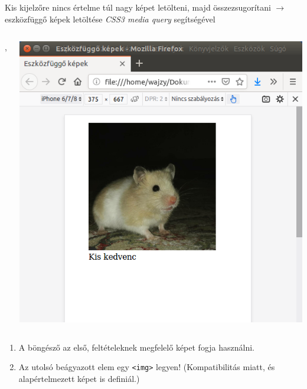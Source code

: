 \begin{frame}
  Kis kijelzőre nincs értelme túl nagy képet letölteni, majd összezsugorítani $\to$ eszközfüggő képek letöltése \emph{CSS3 media query} segítségével
  \begin{columns}
      \begin{exampleblock}{, }
        \tiny
        
      \end{exampleblock}
      \centering \includegraphics[scale=.18]{kepmeret.png}
  \end{columns} 
  \begin{enumerate}
    \item A böngésző az első, feltételeknek megfelelő képet fogja használni.
    \item Az utolsó beágyazott elem egy \texttt{<img>} legyen! (Kompatibilitás miatt, és alapértelmezett képet is definiál.)
  \end{enumerate}
\end{frame}

